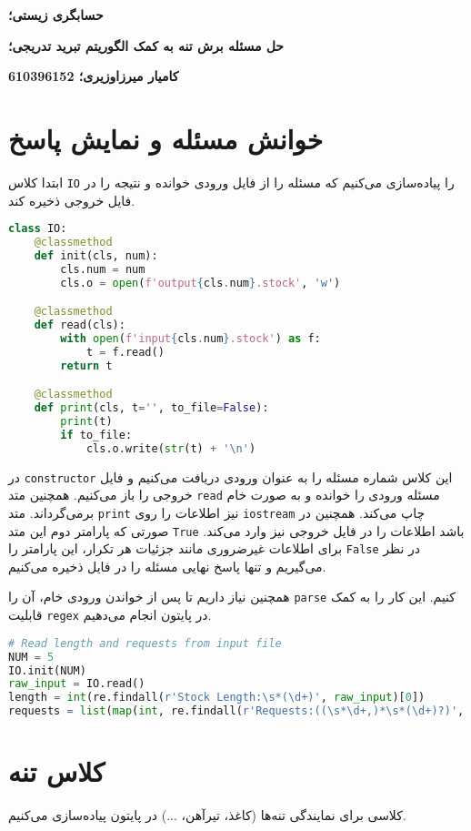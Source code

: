 \documentclass[a4paper, 12pt]{article}
\begin{document}
\textbf{حسابگری زیستی؛}

\textbf{حل مسئله برش تنه به کمک الگوریتم تبرید تدریجی؛}

\textbf{کامیار میرزاوزیری؛ 610396152}

\hrulefill

\section{خوانش مسئله و نمایش پاسخ}

ابتدا کلاس
\texttt{IO}
را پیاده‌سازی می‌کنیم که مسئله را از فایل ورودی خوانده و نتیجه را در فایل خروجی ذخیره کند.

\LTR
\begin{lstlisting}[language=Python]
class IO:
    @classmethod
    def init(cls, num):
        cls.num = num
        cls.o = open(f'output{cls.num}.stock', 'w')

    @classmethod
    def read(cls):
        with open(f'input{cls.num}.stock') as f:
            t = f.read()
        return t

    @classmethod
    def print(cls, t='', to_file=False):
        print(t)
        if to_file:
            cls.o.write(str(t) + '\n')
\end{lstlisting}
\RTL

در
\texttt{constructor}
این کلاس شماره مسئله را به عنوان ورودی دریافت می‌کنیم و فایل خروجی را باز می‌کنیم. همچنین متد
\texttt{read}
مسئله ورودی را خوانده و به صورت خام برمی‌گرداند. متد
\texttt{print}
نیز اطلاعات را روی
\texttt{iostream}
چاپ می‌کند. همچنین در صورتی که پارامتر دوم این متد
\texttt{True}
باشد اطلاعات را در فایل خروجی نیز وارد می‌کند. برای اطلاعات غیرضروری مانند جزئیات هر تکرار، این پارامتر را
\texttt{False}
در نظر می‌گیریم و تنها پاسخ نهایی مسئله را در فایل ذخیره می‌کنیم.

همچنین نیاز داریم تا پس از خواندن ورودی خام، آن را
\texttt{parse}
کنیم. این کار را به کمک قابلیت
\texttt{regex}
در پایتون انجام می‌دهیم.

\LTR
\begin{lstlisting}[language=Python]
# Read length and requests from input file
NUM = 5
IO.init(NUM)
raw_input = IO.read()
length = int(re.findall(r'Stock Length:\s*(\d+)', raw_input)[0])
requests = list(map(int, re.findall(r'Requests:((\s*\d+,)*\s*(\d+)?)', raw_input)[0][0].split(',')))
\end{lstlisting}
\RTL

\newpage
\section{کلاس تنه}
کلاسی برای نمایندگی تنه‌ها (کاغذ، تیرآهن، ...) در پایتون پیاده‌سازی می‌کنیم.
\end{document}

